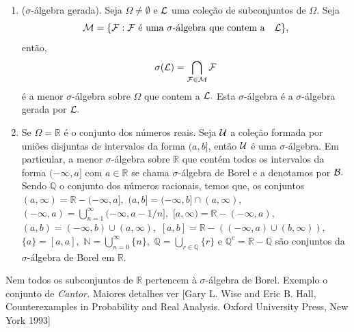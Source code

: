 \begin{frame}
\begin{exem}
\begin{enumerate}

\item ($\sigma$-álgebra gerada). Seja $\Omega\neq \emptyset$ e ${\cal L}$ uma coleção de subconjuntos de $\Omega.$ Seja $${\cal  M}=\{{\cal F}: {\cal F} \ \text{é uma $\sigma$-álgebra que contem a} \quad {\cal L}  \},$$ então, 
$$\sigma({\cal L}) = \bigcap_{{\cal F} \in {\cal M}}{\cal F}$$ é a menor $\sigma$-álgebra sobre $\Omega$ que contem a ${\cal L}.$ Esta $\sigma$-álgebra é a $\sigma$-álgebra gerada por ${\cal L}.$

\item  Se $\Omega =\mathbb{R}$ é o conjunto dos números reais. Seja ${\cal U}$ a
coleção formada por uniões disjuntas de intervalos da forma $(a,b]$, então
${\cal U}$  é uma $\sigma$-álgebra. Em particular, a menor $\sigma$-álgebra
sobre $\mathbb{R}$ que contém todos os intervalos da forma $(-\infty,a]$ com $a
\in \mathbb{R}$ se chama $\sigma$-álgebra de Borel e a denotamos por ${\cal
B}.$ Sendo $\mathbb{Q}$ o conjunto dos números racionais, temos que, os conjuntos 
$(a, \infty)=\mathbb{R}-(-\infty,a],$ 
$(a,b]=(-\infty, b]\cap (a, \infty),$  
$(-\infty,a)=\bigcup_{n=1}^\infty(-\infty,a- 1/n],$ $[a,\infty) = \mathbb{R}-(-\infty, a),$
$(a,b) = (-\infty, b)\cup (a, \infty),$ $[a,b] = \mathbb{R}-((-\infty, a)\cup
(b, \infty)),$  $\{a\}=[a,a],$ $\mathbb{N}=\bigcup_{n=0}^\infty\{n\},$
$\mathbb{Q}=\bigcup_{r \in \mathbb{Q}}\{r\}$ e
$\mathbb{Q}^c=\mathbb{R}-\mathbb{Q}$  são conjuntos da $\sigma$-álgebra de Borel
em $\mathbb{R}.$

 \end{enumerate} 

\end{exem} 
 \begin{nota}
  Nem todos os subconjuntos de $\mathbb{R}$ pertencem à $\sigma$-álgebra de Borel. Exemplo o conjunto de {\it Cantor.} Maiores detalhes ver [Gary L. Wise and Eric B. Hall, Counterexamples in Probability and Real Analysis. Oxford University Press, New York 1993]
 \end{nota}

 
\end{frame}

